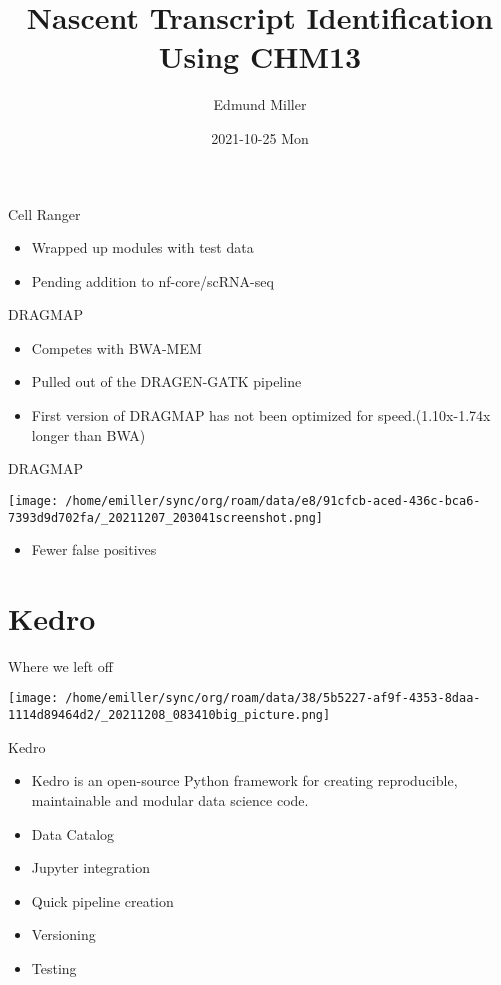 \documentclass[bigger]{beamer}
\author{Edmund Miller}
\date{2021-10-25 Mon}
\title{Nascent Transcript Identification Using CHM13}
\begin{document}
\maketitle


\begin{frame}[label={sec:org4789d20}]{Cell Ranger}
\begin{itemize}
\item Wrapped up modules with test data
\item Pending addition to nf-core/scRNA-seq
\end{itemize}
\end{frame}


\begin{frame}[label={sec:org2a05d57}]{DRAGMAP}
\begin{itemize}
\item Competes with BWA-MEM
\item Pulled out of the DRAGEN-GATK pipeline
\item First version of DRAGMAP has not been optimized for speed.(1.10x-1.74x longer
than BWA)
\end{itemize}
\end{frame}

\begin{frame}[label={sec:org5262ac1}]{DRAGMAP}
\begin{center}
\texttt{[image: /home/emiller/sync/org/roam/data/e8/91cfcb-aced-436c-bca6-7393d9d702fa/\_20211207\_203041screenshot.png]}
\end{center}

\begin{itemize}
\item Fewer false positives
\end{itemize}
\end{frame}


\section{Kedro}
\label{sec:orgefd95dd}

\begin{frame}[label={sec:org88252df}]{Where we left off}
\begin{center}
\texttt{[image: /home/emiller/sync/org/roam/data/38/5b5227-af9f-4353-8daa-1114d89464d2/\_20211208\_083410big\_picture.png]}
\end{center}
\end{frame}


\begin{frame}[label={sec:org2cf9ce6}]{Kedro}
\begin{itemize}
\item Kedro is an open-source Python framework for creating reproducible,
maintainable and modular data science code.
\item Data Catalog
\item Jupyter integration
\item Quick pipeline creation
\item Versioning
\item Testing
\end{itemize}
\end{frame}
\end{document}
